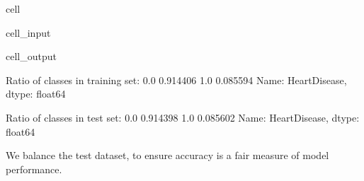 \documentclass[letterpaper,10pt,english]{jupyterBook}
\begin{document}
\begin{sphinxuseclass}{cell}\begin{sphinxVerbatimInput}

\begin{sphinxuseclass}{cell_input}
\begin{sphinxVerbatim}[commandchars=\\\{\}]
      
\end{sphinxVerbatim}

\end{sphinxuseclass}\end{sphinxVerbatimInput}
\begin{sphinxVerbatimOutput}

\begin{sphinxuseclass}{cell_output}
\begin{sphinxVerbatim}[commandchars=\\\{\}]
Ratio of classes in training set:
0.0    0.914406
1.0    0.085594
Name: HeartDisease, dtype: float64

Ratio of classes in test set:
0.0    0.914398
1.0    0.085602
Name: HeartDisease, dtype: float64
\end{sphinxVerbatim}

\end{sphinxuseclass}\end{sphinxVerbatimOutput}

\end{sphinxuseclass}
\sphinxAtStartPar
We balance the test dataset, to ensure accuracy is a fair measure of model performance.
\end{document}
